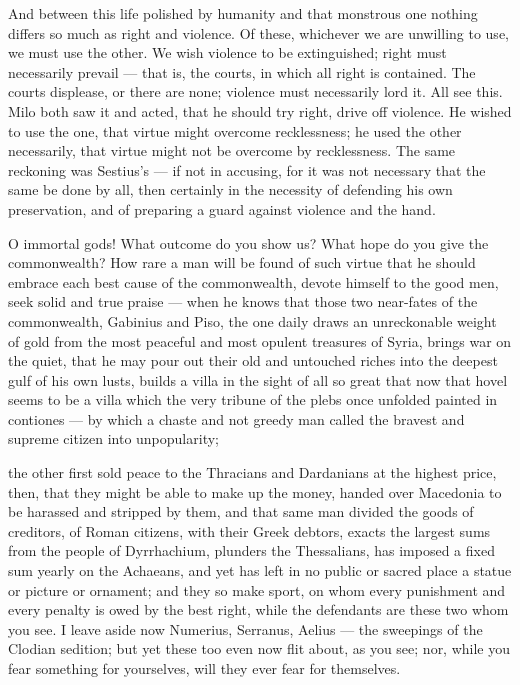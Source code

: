  And between this life polished by humanity and that monstrous one nothing differs so much as right and violence. Of these, whichever we are unwilling to use, we must use the other. We wish violence to be extinguished; right must necessarily prevail --- that is, the courts, in which all right is contained. The courts displease, or there are none; violence must necessarily lord it. All see this. Milo both saw it and acted, that he should try right, drive off violence. He wished to use the one, that virtue might overcome recklessness; he used the other necessarily, that virtue might not be overcome by recklessness. The same reckoning was Sestius's --- if not in accusing, for it was not necessary that the same be done by all, then certainly in the necessity of defending his own preservation, and of preparing a guard against violence and the hand.

 O immortal gods! What outcome do you show us? What hope do you give the commonwealth? How rare a man will be found of such virtue that he should embrace each best cause of the commonwealth, devote himself to the good men, seek solid and true praise --- when he knows that those two near-fates of the commonwealth, Gabinius and Piso, the one daily draws an unreckonable weight of gold from the most peaceful and most opulent treasures of Syria, brings war on the quiet, that he may pour out their old and untouched riches into the deepest gulf of his own lusts, builds a villa in the sight of all so great that now that hovel seems to be a villa which the very tribune of the plebs once unfolded painted in contiones --- by which a chaste and not greedy man called the bravest and supreme citizen into unpopularity;

 the other first sold peace to the Thracians and Dardanians at the highest price, then, that they might be able to make up the money, handed over Macedonia to be harassed and stripped by them, and that same man divided the goods of creditors, of Roman citizens, with their Greek debtors, exacts the largest sums from the people of Dyrrhachium, plunders the Thessalians, has imposed a fixed sum yearly on the Achaeans, and yet has left in no public or sacred place a statue or picture or ornament; and they so make sport, on whom every punishment and every penalty is owed by the best right, while the defendants are these two whom you see. I leave aside now Numerius, Serranus, Aelius --- the sweepings of the Clodian sedition; but yet these too even now flit about, as you see; nor, while you fear something for yourselves, will they ever fear for themselves.

